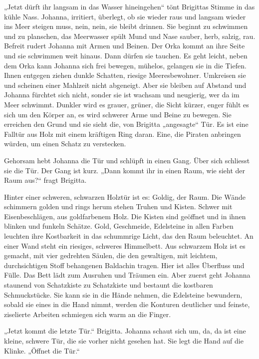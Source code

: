 \documentclass[10pt,titlepage,a5paper]{book}
\begin{document}
„Jetzt dürft ihr langsam in das Wasser hineingehen“ tönt Brigittas Stimme in das kühle Nass. Johanna, irritiert, überlegt, ob sie wieder raus und langsam wieder ins Meer steigen muss, nein, nein, sie bleibt drinnen. 
Sie beginnt zu schwimmen und zu planschen, das Meerwasser spült Mund und Nase sauber, herb, salzig, rau. Befreit rudert Johanna  mit Armen und Beinen. Der Orka kommt an ihre Seite und sie schwimmen weit hinaus. Dann dürfen sie tauchen. Es geht leicht, neben dem Orka kann Johanna sich frei bewegen, mühelos, gelangen sie in  die Tiefen. Ihnen entgegen ziehen dunkle Schatten, riesige Meeresbewohner. Umkreisen sie und scheinen einer Mahlzeit nicht abgeneigt. Aber sie bleiben auf Abstand und Johanna fürchtet sich nicht, sonder sie ist  wachsam und neugierig, wer da im Meer schwimmt. Dunkler wird es grauer, grüner, die Sicht kürzer, enger fühlt es sich um den Körper an, es wird schwerer Arme und Beine zu bewegen. Sie erreichen den Grund und sie sieht die, von Brigitta „angesagte“ Tür. Es ist eine Falltür aus Holz mit einem kräftigen Ring daran. Eine, die Piraten anbringen würden, um einen Schatz zu verstecken.

Gehorsam hebt Johanna die Tür und schlüpft in einen Gang. Über sich schliesst sie die Tür.  Der Gang ist kurz. „Dann kommt ihr in einen Raum, wie sieht der Raum aus?“ fragt Brigitta. 

Hinter einer schweren, schwarzen Holztür ist es: Goldig, der Raum. Die Wände schimmern golden und rings herum stehen Truhen und Kisten. Schwer mit Eisenbeschlägen, aus goldfarbenem Holz. Die Kisten sind geöffnet und in ihnen blinken und funkeln Schätze. Gold, Geschmeide, Edelsteine in allen Farben leuchten ihre Kostbarkeit in das schummrige Licht, das den Raum beleuchtet. An einer Wand steht ein riesiges, schweres Himmelbett. Aus schwarzem Holz ist es gemacht, mit vier gedrehten Säulen, die den gewaltigen, mit leichtem, durchsichtigen Stoff behangenen Baldachin tragen. Hier ist alles Überfluss und Fülle. Das Bett lädt zum Ausruhen und Träumen ein. Aber zuerst geht Johanna staunend von Schatzkiste zu Schatzkiste und bestaunt die kostbaren Schmuckstücke. Sie kann sie in die Hände nehmen, die Edelsteine bewundern, sobald sie eines in die Hand nimmt, werden die Konturen deutlicher und feinste, ziselierte Arbeiten schmiegen sich warm an die Finger.

„Jetzt kommt die letzte Tür.“ Brigitta. Johanna schaut sich um, da, da ist eine kleine, schwere Tür, die sie vorher nicht gesehen hat. Sie legt die Hand auf die Klinke. „Öffnet die Tür.“
\end{document}
